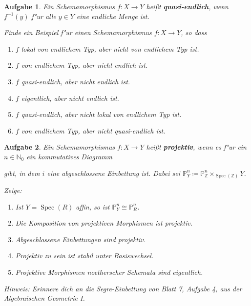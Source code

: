 \documentclass[paper = A4, fontsize=12pt, numbers=noendperiod, chapterprefix=true]{scrbook}
\theoremstyle{break}
\newtheorem{Aufg}{Aufgabe}
\theoremstyle{nonumberbreak}
\theoremstyle{nonumberplain}
\DeclareMathOperator{\Spec}{Spec}
\newcommand{\N}{\mathbb{N}}
\newcommand{\Z}{\mathbb{Z}}
\begin{document}
\begin{Aufg}
Ein Schemamorphismus $f\colon X\to Y$ hei\ss t \textbf{quasi-endlich}, wenn $f^{-1}(y)$ f"ur alle $y\in Y$ eine endliche Menge ist.

Finde ein Beispiel f"ur einen Schemamorphismus $f\colon X\to Y$, so dass
\begin{enumerate}%
 \item $f$ lokal von endlichem Typ, aber nicht von endlichem Typ ist.
 \item $f$ von endlichem Typ, aber nicht endlich ist.
 \item $f$ quasi-endlich, aber nicht endlich ist.
 \item $f$ eigentlich, aber nicht endlich ist.
 \item $f$ quasi-endlich, aber nicht lokal von endlichem Typ ist.
 \item $f$ von endlichem Typ, aber nicht quasi-endlich ist.
\end{enumerate}
\end{Aufg}


\begin{Aufg}
Ein Schemamorphismus $f\colon X \rightarrow Y$ hei\ss t \textbf{projektiv}, wenn es f"ur ein $n \in \N_0$ ein kommutatives Diagramm 
\begin{minipage}{4cm}
\end{minipage}
gibt, in dem $i$ eine abgeschlossene Einbettung ist. Dabei sei $\mathbb{P}^n_Y \coloneqq \mathbb{P}^n_{\Z} \times_{\Spec(\Z)} Y$.

Zeige:
\begin{enumerate}%
\item Ist $Y=\Spec(R)$ affin, so ist $\mathbb{P}^n_Y \cong \mathbb{P}^n_R$.
\item Die Komposition von projektiven Morphismen ist projektiv.
\item Abgeschlossene Einbettungen sind projektiv.
\item Projektiv zu sein ist stabil unter Basiswechsel.
\item Projektive Morphismen noetherscher Schemata sind eigentlich.
\end{enumerate}

\textit{Hinweis:} Erinnere dich an die Segre-Einbettung von Blatt 7, Aufgabe 4, aus der Algebraischen Geometrie I.
\end{Aufg}
\end{document}
